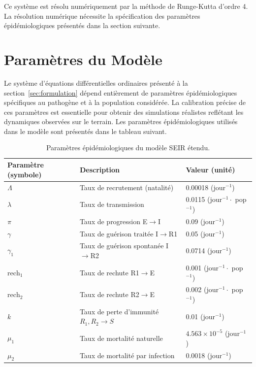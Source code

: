\documentclass[11pt]{article}
\begin{document}
Ce système est résolu numériquement par la méthode de Runge-Kutta d'ordre 4. La résolution numérique nécessite la spécification des paramètres épidémiologiques présentés dans la section suivante.

\section{Paramètres du Modèle}\label{sec:parametres}

Le système d'équations différentielles ordinaires présenté à la section~\ref{sec:formulation} dépend entièrement de paramètres épidémiologiques spécifiques au pathogène et à la population considérée. La calibration précise de ces paramètres est essentielle pour obtenir des simulations réalistes reflétant les dynamiques observées sur le terrain.
Les paramètres épidémiologiques utilisés dans le modèle sont présentés dans le tableau suivant.


\begin{table}[h]
\centering
\caption{Paramètres épidémiologiques du modèle SEIR étendu.}
\label{tab:parametres}
\begin{tabular}{@{}lll@{}}
\toprule
Paramètre (symbole) & Description & Valeur (unité) \\
\midrule
$\Lambda$ & Taux de recrutement (natalité) & 0.00018 (jour$^{-1}$) \\
$\lambda$ & Taux de transmission & 0.0115 (jour$^{-1} \cdot$ pop$^{-1}$) \\
$\pi$ & Taux de progression E$\to$I & 0.09 (jour$^{-1}$) \\
$\gamma$ & Taux de guérison traitée I$\to$R1 & 0.05 (jour$^{-1}$) \\
$\gamma_1$ & Taux de guérison spontanée I$\to$R2 & 0.0714 (jour$^{-1}$) \\
$\mathrm{rech}_1$ & Taux de rechute R1$\to$E & 0.001 (jour$^{-1} \cdot$ pop$^{-1}$) \\
$\mathrm{rech}_2$ & Taux de rechute R2$\to$E & 0.002 (jour$^{-1} \cdot$ pop$^{-1}$) \\
$k$ & Taux de perte d'immunité $R_1, R_2 \to S$ & 0.01 (jour$^{-1}$) \\
$\mu_1$ & Taux de mortalité naturelle & $4.563 \times 10^{-5}$ (jour$^{-1}$) \\
$\mu_2$ & Taux de mortalité par infection & 0.0018 (jour$^{-1}$) \\
\bottomrule
\end{tabular}
\end{table}
\end{document}
